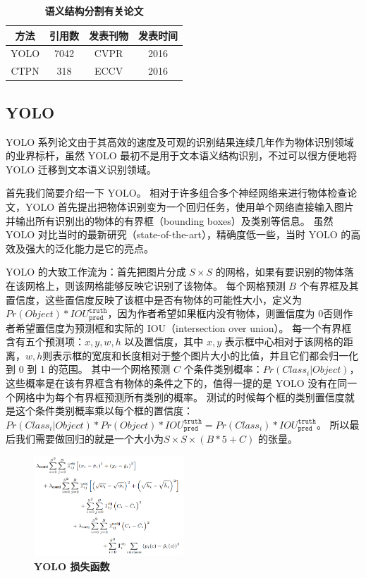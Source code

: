 \begin{table}[!hpt]
	\caption[]{\textbf{语义结构分割有关论文}}
	\label{tab:preprocessing_papers}
	\centering
	\begin{tabular}{c c c c}
		\hline
		方法 & 引用数 & 发表刊物 & 发表时间 \\ [0.5ex] 
		\hline
		YOLO & 7042 & CVPR & 2016 \\
		CTPN & 318 & ECCV & 2016 \\
		\hline
	\end{tabular}
\end{table}

\subsection{YOLO}
YOLO 系列论文由于其高效的速度及可观的识别结果连续几年作为物体识别领域的业界标杆，虽然 YOLO 最初不是用于文本语义结构识别，不过可以很方便地将 YOLO 迁移到文本语义识别领域。

首先我们简要介绍一下 YOLO\cite{YOLO}。
相对于许多组合多个神经网络来进行物体检查论文，YOLO 首先提出把物体识别变为一个回归任务，使用单个网络直接输入图片并输出所有识别出的物体的有界框（bounding boxes）及类别等信息。
虽然 YOLO 对比当时的最新研究（state-of-the-art），精确度低一些，当时 YOLO 的高效及强大的泛化能力是它的亮点。

YOLO 的大致工作流为：首先把图片分成 $S \times S$ 的网格，如果有要识别的物体落在该网格上，则该网格能够反映它识别了该物体。
每个网格预测 $B$ 个有界框及其置信度，这些置信度反映了该框中是否有物体的可能性大小，定义为 $Pr(Object)*IOU^{\texttt{truth}}_{\texttt{pred}}$，因为作者希望如果框内没有物体，则置信度为 $0$否则作者希望置信度为预测框和实际的 IOU（intersection over union）。
每一个有界框含有五个预测项：$x,y,w,h$ 以及置信度，其中 $x,y$ 表示框中心相对于该网格的距离，$w,h$则表示框的宽度和长度相对于整个图片大小的比值，并且它们都会归一化到 0 到 1 的范围。
其中一个网格预测 $C$ 个条件类别概率：$Pr(Class_i|Object)$，这些概率是在该有界框含有物体的条件之下的，值得一提的是 YOLO 没有在同一个网格中为每个有界框预测所有类别的概率。
测试的时候每个框的类别置信度就是这个条件类别概率乘以每个框的置信度：$Pr(Class_i|Object)*Pr(Object)*IOU^{\texttt{truth}}_{\texttt{pred}} = Pr(Class_i)*IOU^{\texttt{truth}}_{\texttt{pred}}$。
所以最后我们需要做回归的就是一个大小为$S \times S \times (B * 5 + C)$ 的张量。

\begin{figure}[h!]
	\centering
	\includegraphics[width=0.5\textwidth]{figure/resources/YOLO_loss.png}
	\caption{\textbf{YOLO 损失函数}\label{YOLO_loss}}
\end{figure}

